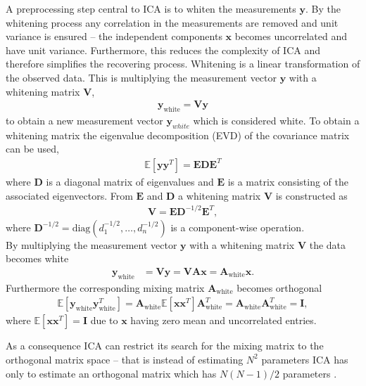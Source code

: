 A preprocessing step central to ICA is to whiten the measurements $\mathbf{y}$. 
By the whitening process any correlation in the measurements are removed and unit variance is ensured -- the independent components $\mathbf{x}$ becomes uncorrelated and have unit variance. 
Furthermore, this reduces the complexity of ICA and therefore simplifies the recovering process.
Whitening is a linear transformation of the observed data. 
This is multiplying the measurement vector $\textbf{y}$ with a whitening matrix $\textbf{V}$,
\begin{align*}
\textbf{y}_{\text{white}} = \textbf{V}\textbf{y}
\end{align*} 
to obtain a new measurement vector $\textbf{y}_{white}$ which is considered white. 
To obtain a whitening matrix the eigenvalue decomposition (EVD) of the covariance matrix can be used,
\begin{align*}
\mathbb{E}[\mathbf{yy}^T] = \mathbf{EDE}^T
\end{align*}
where $\mathbf{D}$ is a diagonal matrix of eigenvalues and $\mathbf{E}$ is a matrix consisting of the associated eigenvectors. 
From $\mathbf{E}$ and $\mathbf{D}$ a whitening matrix $\mathbf{V}$ is constructed as
\begin{align*}
\mathbf{V} = \mathbf{ED}^{-1/2} \mathbf{E}^T,
\end{align*}
where $\mathbf{D}^{-1/2} = \text{diag}(d_1^{-1/2},\dots, d_n^{-1/2})$ is a component-wise operation\cite[p.159]{ICA}.
\\  
By multiplying the measurement vector $\mathbf{y}$ with a whitening matrix $\mathbf{V}$ the data becomes white
\begin{align}
\mathbf{y}_{\text{white}} &= \mathbf{Vy} = \mathbf{VAx} = \mathbf{A}_{\text{white}} \mathbf{x}. \nonumber
\end{align}
Furthermore the corresponding mixing matrix $\mathbf{A}_{\text{white}}$ becomes orthogonal 
\begin{align*}
 \mathbb{E}[\mathbf{y}_{\text{white}} \mathbf{y}_{\text{white}}^T] = \mathbf{A}_{\text{white}} \mathbb{E}[\mathbf{xx}^T] \mathbf{A}_{\text{white}}^T = \mathbf{A}_{\text{white}} \mathbf{A}_{\text{white}}^T = \mathbf{I},
 \end{align*} 
where $\mathbb{E}[\mathbf{xx}^T] = \mathbf{I}$ due to $\textbf{x}$ having zero mean and uncorrelated entries. 

As a consequence ICA can restrict its search for the mixing matrix to the orthogonal matrix space -- that is instead of estimating $N^2$ parameters ICA has only to estimate an orthogonal matrix which has $N(N-1)/2$ parameters \cite[p. 159]{ICA}.

